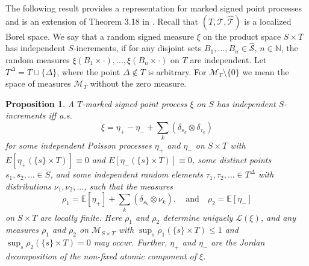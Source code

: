 \documentclass{article}
\theoremstyle{plain}
\newtheorem{proposition}[theorem]{Proposition}
\theoremstyle{remark}
\begin{document}
The following result provides a representation for marked signed point processes and is an extension of Theorem 3.18 in \citet{Kallenberg2}. Recall that $(T,\mathcal{T},\hat{\mathcal{T}})$ is a localized Borel space. We say that a random signed measure $\xi$ on the product space $S\times T$ has independent $S$-increments, if for any disjoint sets $B_1, . . . , B_n\in\hat{\mathcal{S}}$, $n\in\mathbb{N}$, the random measures $\xi(B_1 \times\cdot),...,\xi(B_n\times\cdot)$ on $T$ are independent. Let $T^{\Delta}=T\cup\{\Delta\}$, where the point $\Delta\notin T$ is arbitrary. For $\mathcal{M}_T\setminus\{0\}$ we mean the space of measures $\mathcal{M}_T$ without the zero measure.
\begin{proposition}\label{pro-marked-signed}
	A $T$-marked signed point process $\xi$ on $S$ has independent $S$-increments iff a.s.
	\begin{equation*}
		\xi=\eta_+-\eta_-+\sum_{k}(\delta_{s_k}\otimes\delta_{\tau_k})
	\end{equation*}
	for some independent Poisson processes $\eta_+$ and $\eta_-$ on $S\times T$ with $E[\eta_+(\{s\}\times T)]\equiv 0$ and $E[\eta_-(\{s\}\times T)]\equiv 0$, some distinct points $s_1,s_2,...\in S$, and some independent random elements $\tau_1,\tau_2,...\in T^{\Delta}$ with distributions $\nu_1,\nu_2,...$, such that the measures
	\begin{equation*}
		\rho_1=\mathbb{E}[\eta_+]+\sum_{k}(\delta_{s_k}\otimes\nu_{k}),\quad\text{and}\quad 	\rho_2=\mathbb{E}[\eta_-]
	\end{equation*}
	on $S\times T$ are locally finite. Here $\rho_1$ and $\rho_2$ determine uniquely $\mathcal{L}(\xi)$, and any measures $\rho_1$ and $\rho_2$ on $\mathcal{M}_{S\times T}$ with $\sup_{s}\rho_1(\{s\}\times T)\leq 1$ and  $\sup_{s}\rho_2(\{s\}\times T)=0$ may occur. Further, $\eta_+$ and $\eta_-$ are the Jordan decomposition of the non-fixed atomic component of $\xi$.
\end{proposition}
\end{document}
